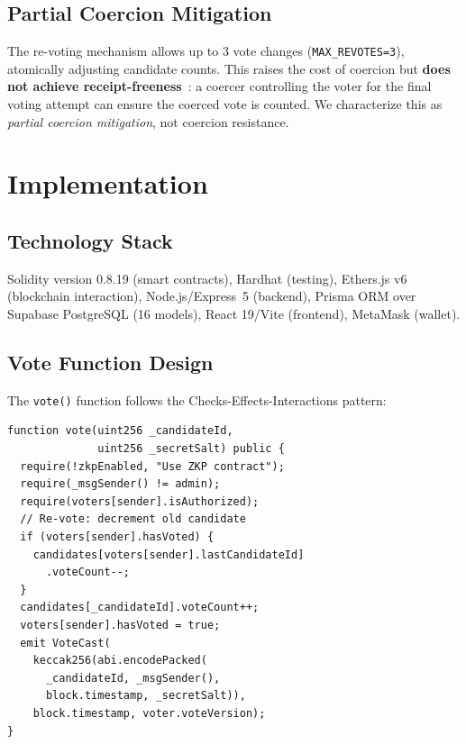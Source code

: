 \documentclass[conference]{IEEEtran}
\begin{document}
\subsection{Partial Coercion Mitigation}
The re-voting mechanism allows up to 3 vote changes (\texttt{MAX\_REVOTES=3}), atomically adjusting candidate counts. This raises the cost of coercion but \textbf{does not achieve receipt-freeness}~\cite{juels2005}: a coercer controlling the voter for the final voting attempt can ensure the coerced vote is counted. We characterize this as \emph{partial coercion mitigation}, not coercion resistance.

\section{Implementation}

\subsection{Technology Stack}
Solidity version 0.8.19 (smart contracts), Hardhat (testing), Ethers.js v6 (blockchain interaction), Node.js/Express~5 (backend), Prisma ORM over Supabase PostgreSQL (16 models), React 19/Vite (frontend), MetaMask (wallet).

\subsection{Vote Function Design}
The \texttt{vote()} function follows the Checks-Effects-Interactions pattern:

\begin{lstlisting}[language=Solidity]
function vote(uint256 _candidateId,
              uint256 _secretSalt) public {
  require(!zkpEnabled, "Use ZKP contract");
  require(_msgSender() != admin);
  require(voters[sender].isAuthorized);
  // Re-vote: decrement old candidate
  if (voters[sender].hasVoted) {
    candidates[voters[sender].lastCandidateId]
      .voteCount--;
  }
  candidates[_candidateId].voteCount++;
  voters[sender].hasVoted = true;
  emit VoteCast(
    keccak256(abi.encodePacked(
      _candidateId, _msgSender(),
      block.timestamp, _secretSalt)),
    block.timestamp, voter.voteVersion);
}
\end{lstlisting}
\end{document}
